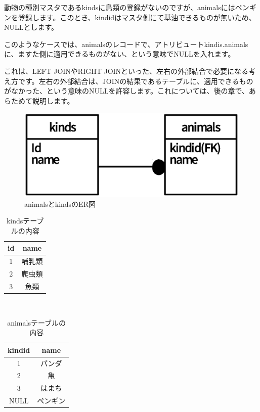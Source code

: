 動物の種別マスタであるkindsに鳥類の登録がないのですが、animalsにはペンギンを登録します。このとき、kindidはマスタ側にて基油できるものが無いため、NULLとします。

このようなケースでは、animalsのレコードで、アトリビュートkindis.animalsに、ますた側に適用できるものがない、という意味でNULLを入れます。

これは、LEFT JOINやRIGHT JOINといった、左右の外部結合で必要になる考え方です。左右の外部結合は、JOINの結果であるテーブルに、適用できるものがなかった、という意味のNULLを許容します。これについては、後の章で、あらためて説明します。

\begin{figure}[htbp]
	\includegraphics[width=12cm,clip]{draw/null_er.eps}
	\caption{animalsとkindsのER図}
	\label{fig:animals_kinds_er}
\end{figure}

\begin{table}[htb]
  \begin{tabular}{|c|c|} \hline
    id & name \\ \hline
    1 & 哺乳類 \\
    2 & 爬虫類 \\
    3 & 魚類 \\ \hline
  \end{tabular}
　　\label{table:kinds}
　　\caption{kindsテーブルの内容}
\end{table}

\begin{table}[htb]
  \begin{tabular}{|c|c|} \hline
    kindid & name \\ \hline
    1 & パンダ \\
    2 & 亀 \\
    3 & はまち \\
    NULL & ペンギン \\ \hline
  \end{tabular}
　　\label{table:animals}
　　\caption{animalsテーブルの内容}
\end{table}


